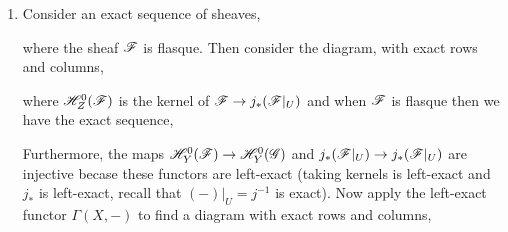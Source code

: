 \documentclass[12pt]{article}
\begin{document}
\begin{enumerate}
\item Consider an exact sequence of sheaves,
\begin{center}
\end{center}
where the sheaf $\mathscr{F}$ is flasque. Then consider the diagram, with exact rows and columns,
\begin{center}
\end{center}
where $\mathscr{H}^0_Z(\mathscr{F})$ is the kernel of $\mathscr{F} \to j_*(\mathscr{F} |_U)$ and when $\mathscr{F}$ is flasque then we have the exact sequence,
\begin{center}
\end{center}
Furthermore, the maps $\mathscr{H}_Y^0(\mathscr{F}) \to \mathscr{H}^0_Y(\mathscr{G})$ and $j_*(\mathscr{F} |_U) \to j_*(\mathscr{F} |_U)$ are injective becase these functors are left-exact (taking kernels is left-exact and $j_*$ is left-exact, recall that $(-)|_U = j^{-1}$ is exact). Now apply the left-exact functor $\Gamma(X, -)$ to find a diagram with exact rows and columns,
\begin{center}

\end{center}
\end{enumerate}
\end{document}

